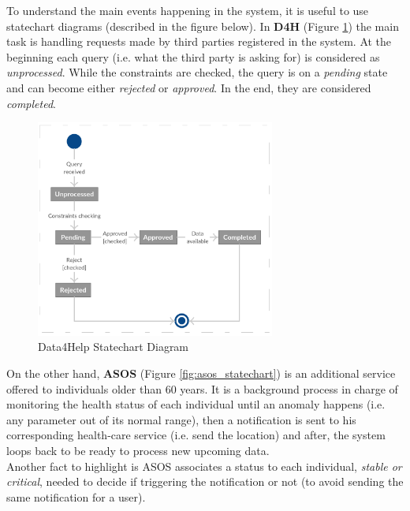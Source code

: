\documentclass[a4paper, hidelinks, 12pt]{report}
\begin{document}
	To understand the main events happening in the system, it is useful to use statechart diagrams (described in the figure below). In \textbf {D4H} (Figure \ref{fig:d4h_statechart}) the main task is handling requests made by third parties registered in the system. At the beginning each query (i.e. what the third party is asking for) is considered as \textit{unprocessed}. While the constraints are checked, the query is on a \textit{pending} state and can become either \textit{rejected} or \textit{approved}. In the end, they are considered \textit{completed}. \\
	
	\begin{figure}[H]
		\centering
		\includegraphics[width=0.7\textwidth]{Diagrams/d4h_statechart.png}
		\caption[Data4Help Statechart Diagram]{Data4Help Statechart Diagram}
		\label{fig:d4h_statechart}
	\end{figure}
	
	On the other hand, \textbf{ASOS} (Figure \ref{fig:asos_statechart}) is an additional service offered to individuals older than 60 years. It is a background process in charge of monitoring the health status of each individual until an anomaly happens (i.e. any parameter out of its normal range), then a notification is sent to his corresponding health-care service (i.e. send the location) and after, the system loops back to be ready to process new upcoming data. \\
	
	Another fact to highlight is ASOS associates a status to each individual, \textit{stable or critical}, needed to decide if triggering the notification or not (to avoid sending the same notification for a user). \\
	
\end{document}
